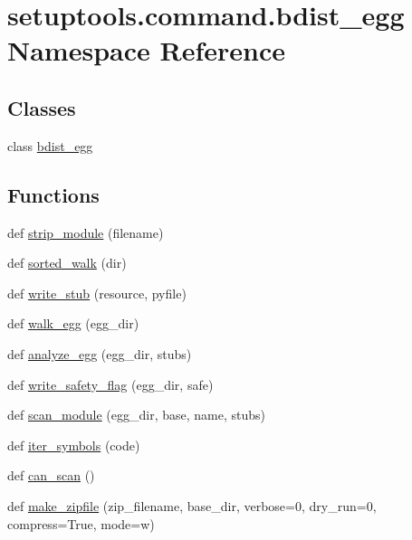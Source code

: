 \hypertarget{namespacesetuptools_1_1command_1_1bdist__egg}{}\section{setuptools.\+command.\+bdist\+\_\+egg Namespace Reference}
\label{namespacesetuptools_1_1command_1_1bdist__egg}
\subsection*{Classes}
\begin{DoxyCompactItemize}
\item 
class \hyperlink{classsetuptools_1_1command_1_1bdist__egg_1_1bdist__egg}{bdist\+\_\+egg}
\end{DoxyCompactItemize}
\subsection*{Functions}
\begin{DoxyCompactItemize}
\item 
def \hyperlink{namespacesetuptools_1_1command_1_1bdist__egg_a2a58a1997d8099deae92ca117efa2bc0}{strip\+\_\+module} (filename)
\item 
def \hyperlink{namespacesetuptools_1_1command_1_1bdist__egg_a475ca685e10db35e7fdf57cf2d1cad05}{sorted\+\_\+walk} (dir)
\item 
def \hyperlink{namespacesetuptools_1_1command_1_1bdist__egg_ab10fa2ab8a63f014f990f6d38085ea56}{write\+\_\+stub} (resource, pyfile)
\item 
def \hyperlink{namespacesetuptools_1_1command_1_1bdist__egg_ac8cbe5e3bca6f6a198d15421a238c141}{walk\+\_\+egg} (egg\+\_\+dir)
\item 
def \hyperlink{namespacesetuptools_1_1command_1_1bdist__egg_a006cd7effcbb632204ea3f7f23e751d5}{analyze\+\_\+egg} (egg\+\_\+dir, stubs)
\item 
def \hyperlink{namespacesetuptools_1_1command_1_1bdist__egg_a3b02f991a66601479e8a3b265608226e}{write\+\_\+safety\+\_\+flag} (egg\+\_\+dir, safe)
\item 
def \hyperlink{namespacesetuptools_1_1command_1_1bdist__egg_a7934760ce13e5b455dbd1d6d846ceb03}{scan\+\_\+module} (egg\+\_\+dir, base, name, stubs)
\item 
def \hyperlink{namespacesetuptools_1_1command_1_1bdist__egg_a9495041e4a8f92950d2bdb36aa77c687}{iter\+\_\+symbols} (code)
\item 
def \hyperlink{namespacesetuptools_1_1command_1_1bdist__egg_a7a71ad90d0371c4eba9cc117659dce07}{can\+\_\+scan} ()
\item 
def \hyperlink{namespacesetuptools_1_1command_1_1bdist__egg_a4095fa33cd60e2569800461be97be563}{make\+\_\+zipfile} (zip\+\_\+filename, base\+\_\+dir, verbose=0, dry\+\_\+run=0, compress=True, mode=\textquotesingle{}w\textquotesingle{})
\end{DoxyCompactItemize}
